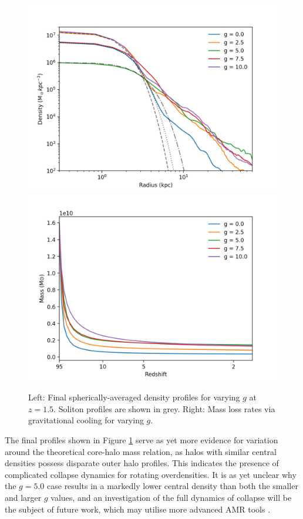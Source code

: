 \documentclass[a4paper,11pt]{article}
\begin{document}
\begin{figure}[!htb]
\centering
{}
  \includegraphics[trim={1.5cm 0 2cm 0.2cm},scale=0.55]{profiles_rotation.png}
\endminipage\hfill
{}%
  \includegraphics[trim={0.5cm 0 2cm 0},scale=0.55]{mass_loss_rotation.png}
\endminipage
\caption{Left: Final spherically-averaged density profiles for varying $g$ at $z=1.5$. Soliton profiles are shown in grey. Right: Mass loss rates via gravitational cooling for varying $g$.}\label{fig:profiles_mass_rotation}
\end{figure}

The final profiles shown in Figure \ref{fig:profiles_mass_rotation} serve as yet more evidence for variation around the theoretical core-halo mass relation, as halos with similar central densities possess disparate outer halo profiles. This indicates the presence of complicated collapse dynamics for rotating overdensities. It is as yet unclear why the $g=5.0$ case results in a markedly lower central density than both the smaller and larger $g$ values, and an investigation of the full dynamics of collapse will be the subject of future work, which may utilise more advanced AMR tools \cite{Schwabe:2020eac}.
\end{document}
